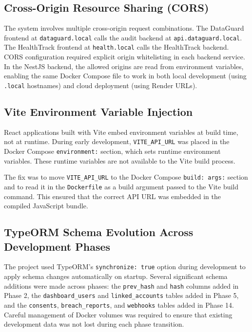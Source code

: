 \documentclass[a4paper,12pt,onecolumn]{report}
\begin{document}
\subsection{Cross-Origin Resource Sharing (CORS)}

The system involves multiple cross-origin request combinations.
The DataGuard frontend at \texttt{dataguard.local} calls the audit backend at \texttt{api.dataguard.local}.
The HealthTrack frontend at \texttt{health.local} calls the HealthTrack backend.
CORS configuration required explicit origin whitelisting in each backend service.
In the NestJS backend, the allowed origins are read from environment variables, enabling the same Docker Compose file to work in both local development (using \texttt{.local} hostnames) and cloud deployment (using Render URLs).

\subsection{Vite Environment Variable Injection}

React applications built with Vite embed environment variables at build time, not at runtime.
During early development, \texttt{VITE\_API\_URL} was placed in the Docker Compose \texttt{environment:} section, which sets runtime environment variables.
These runtime variables are not available to the Vite build process.

The fix was to move \texttt{VITE\_API\_URL} to the Docker Compose \texttt{build: args:} section and to read it in the \texttt{Dockerfile} as a build argument passed to the Vite build command.
This ensured that the correct API URL was embedded in the compiled JavaScript bundle.

\subsection{TypeORM Schema Evolution Across Development Phases}

The project used TypeORM's \texttt{synchronize: true} option during development to apply schema changes automatically on startup.
Several significant schema additions were made across phases: the \texttt{prev\_hash} and \texttt{hash} columns added in Phase 2, the \texttt{dashboard\_users} and \texttt{linked\_accounts} tables added in Phase 5, and the \texttt{consents}, \texttt{breach\_reports}, and \texttt{webhooks} tables added in Phase 14.
Careful management of Docker volumes was required to ensure that existing development data was not lost during each phase transition.
\end{document}
